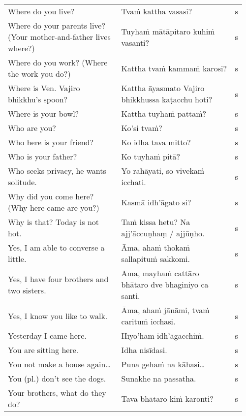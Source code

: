 \documentclass[a5paper]{memoir}
\begin{document}
\begin{longtable}{L{0.48\linewidth} L{0.48\linewidth} H}
Where do you live? & Tvaṁ kattha vasasi? & s\\[0pt]
Where do your parents live? (Your mother-and-father lives where?) & Tuyhaṁ mātāpitaro kuhiṁ vasanti? & s\\[0pt]
Where do you work? (Where the work you do?) & Kattha tvaṁ kammaṁ karosi? & s\\[0pt]
Where is Ven. Vajiro bhikkhu's spoon? & Kattha āyasmato Vajiro bhikkhussa kaṭacchu hoti? & s\\[0pt]
Where is your bowl? & Kattha tuyhaṁ pattaṁ? & s\\[0pt]
Who are you? & Ko'si tvaṁ? & s\\[0pt]
Who here is your friend? & Ko idha tava mitto? & s\\[0pt]
Who is your father? & Ko tuyhaṁ pitā? & s\\[0pt]
Who seeks privacy, he wants solitude. & Yo rahāyati, so vivekaṁ icchati. & s\\[0pt]
Why did you come here? (Why here came are you?) & Kasmā idh'āgato si? & s\\[0pt]
Why is that? Today is not hot. & Taṁ kissa hetu? Na ajj'āccuṇhaṃ / ajjūṇho. & s\\[0pt]
Yes, I am able to converse a little. & Āma, ahaṁ thokaṁ sallapituṁ sakkomi. & s\\[0pt]
Yes, I have four brothers and two sisters. & Āma, mayhaṁ cattāro bhātaro dve bhaginiyo ca santi. & s\\[0pt]
Yes, I know you like to walk. & Āma, ahaṁ jānāmi, tvaṁ carituṁ icchasi. & s\\[0pt]
Yesterday I came here. & Hīyo'ham idh'āgacchiṁ. & s\\[0pt]
You are sitting here. & Idha nisīdasi. & s\\[0pt]
You not make a house again\ldots{} & Puna gehaṁ na kāhasi\ldots{} & s\\[0pt]
You (pl.) don't see the dogs. & Sunakhe na passatha. & s\\[0pt]
Your brothers, what do they do? & Tava bhātaro kiṁ karonti? & s\\[0pt]
\end{longtable}
\end{document}
